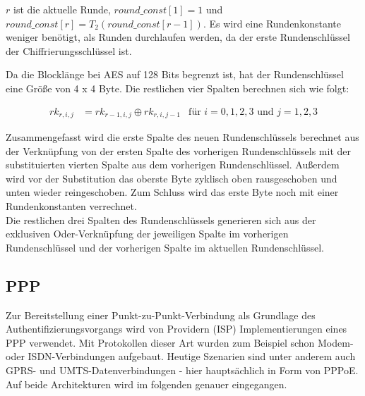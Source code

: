   $r$ ist die aktuelle Runde, $round\_const[1] = 1$ und $round\_const[r] = T_2(round\_const[r-1])$. Es wird eine
   Rundenkonstante weniger benötigt, als Runden durchlaufen werden, da der erste Rundenschlüssel der 
   Chiffrierungs\-schlüssel ist.
   
   Da die Blocklänge bei AES auf 128 Bits begrenzt ist, hat der Rundenschlüssel eine Größe von 4 x 4 Byte. Die
   restlichen vier Spalten berechnen sich wie folgt:
   
    \begin{equation*}
     \begin{aligned}
      rk_{r,i,j} &= rk_{r-1,i,j} \oplus rk_{r,i,j-1} &\text{für $i = 0, 1, 2, 3$ und $j = 1, 2, 3$}
     \end{aligned}
    \end{equation*}
    
   Zusammengefasst wird die erste Spalte des neuen Rundenschlüssels berechnet aus der Verknüpfung
   von der ersten Spalte des vorherigen Rundenschlüssels mit der substituierten vierten Spalte aus dem vorherigen
   Rundenschlüssel. Außerdem wird vor der Substitution das oberste Byte zyklisch oben rausgeschoben und unten
   wieder reingeschoben. Zum Schluss wird das erste Byte noch mit einer Rundenkonstanten verrechnet. \\
   Die restlichen drei Spalten des Rundenschlüssels generieren sich aus der exklusiven Oder-Verknüpfung der
   jeweiligen Spalte im vorherigen Rundenschlüssel und der vorherigen Spalte im aktuellen Rundenschlüssel.

\subsection{PPP}
Zur Bereitstellung einer Punkt-zu-Punkt-Verbindung als Grundlage des Authentifizierungsvorgangs
wird von Providern (\ac{ISP}) Implementierungen eines
\ac{PPP} verwendet. Mit Protokollen dieser Art wurden zum Beispiel schon Modem- oder ISDN-Verbindungen
aufgebaut. Heutige Szenarien sind unter anderem auch GPRS- und UMTS-Datenverbindungen -
hier hauptsächlich in
Form von \ac{PPPoE}. Auf beide Architekturen wird im folgenden
genauer eingegangen.

